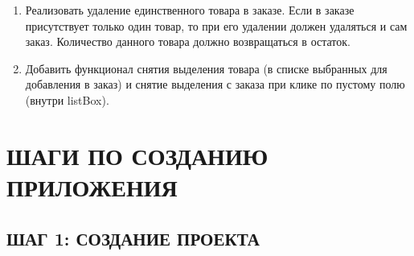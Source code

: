 \documentclass[12pt]{article}
\begin{document}
\begin{enumerate}
	\item[\faTrash] Реализовать удаление единственного товара в заказе. Если в заказе присутствует только один товар, то при его удалении должен удаляться и сам заказ. Количество данного товара должно возвращаться в остаток.

	\item[\faHighlighter] Добавить функционал снятия выделения товара (в списке выбранных для добавления в заказ) и снятие выделения с заказа при клике по пустому полю (внутри listBox).

\end{enumerate}

\newpage

\section{ШАГИ ПО СОЗДАНИЮ ПРИЛОЖЕНИЯ ~\texorpdfstring{\faRoute}{}}

\subsection{ШАГ 1: СОЗДАНИЕ ПРОЕКТА}
\end{document}
